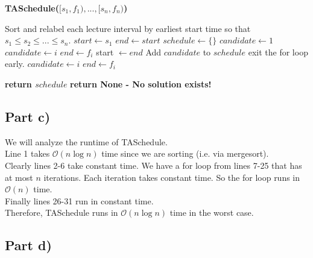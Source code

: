 \documentclass[12pt]{article}
\begin{document}
\begin{algorithm}[hbt!]
\caption{\textbf{TASchedule($[s_1, f_1),...,[s_n,f_n)$)}}\label{alg:cap}

\begin{algorithmic}[1]
\State Sort and relabel each lecture interval by earliest start time so that $s_1 \leq s_2 \leq ... \leq s_n$. 
\State $start \gets s_1$
\State $end \gets start$
\State $schedule \gets \{\}$ 
\State $candidate \gets 1$ 
\State
{}
        \State $candidate \gets i$
        \State $end \gets f_i$
    \Else
        \State start $\gets end$
        \State Add $candidate$ to $schedule$ 
        \State
            \State exit the for loop early.
        \EndIf
        \State
         
            \State $candidate \gets i$
            \State $end \gets f_{i}$
        \EndIf
        \State
    \EndIf
\EndFor
\State

    \State \textbf{return $schedule$}
\Else
    \State \textbf{return None - No solution exists!}
\EndIf
\end{algorithmic}
\end{algorithm}

\subsection*{Part c)}

We will analyze the runtime of TASchedule. \\

Line 1 takes $\mathcal{O}(n \log n)$ time since we are sorting (i.e. via mergesort). \\

Clearly lines 2-6 take constant time. We have a for loop from lines 7-25 that has at most $n$ iterations. Each iteration takes constant time. So the for loop runs in $\mathcal{O}(n)$ time. \\

Finally lines 26-31 run in constant time. \\

Therefore, TASchedule runs in $\mathcal{O}(n \log n)$ time in the worst case. 

\subsection*{Part d)}
\end{document}
